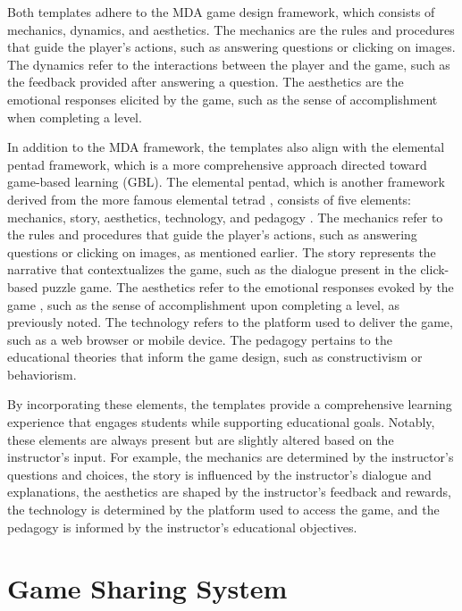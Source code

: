 Both templates adhere to the MDA \cite{MDA2004} game design framework, which consists of mechanics, dynamics, and aesthetics. The mechanics are the rules and procedures that guide the player's actions, such as answering questions or clicking on images. The dynamics refer to the interactions between the player and the game, such as the feedback provided after answering a question. The aesthetics are the emotional responses elicited by the game, such as the sense of accomplishment when completing a level.

In addition to the MDA framework, the templates also align with the elemental pentad framework, which is a more comprehensive approach directed toward game-based learning (GBL). The elemental pentad, which is another framework derived from the more famous elemental tetrad \cite{tetrad2011}, consists of five elements: mechanics, story, aesthetics, technology, and pedagogy \cite{ahmad2019}. The mechanics refer to the rules and procedures that guide the player's actions, such as answering questions or clicking on images, as mentioned earlier. The story represents the narrative that contextualizes the game, such as the dialogue present in the click-based puzzle game. The aesthetics refer to the emotional responses evoked by the game \cite{MDA2004}, such as the sense of accomplishment upon completing a level, as previously noted. The technology refers to the platform used to deliver the game, such as a web browser or mobile device. The pedagogy pertains to the educational theories that inform the game design, such as constructivism or behaviorism.

By incorporating these elements, the templates provide a comprehensive learning experience that engages students while supporting educational goals. Notably, these elements are always present but are slightly altered based on the instructor's input. For example, the mechanics are determined by the instructor's questions and choices, the story is influenced by the instructor's dialogue and explanations, the aesthetics are shaped by the instructor's feedback and rewards, the technology is determined by the platform used to access the game, and the pedagogy is informed by the instructor's educational objectives.


\section{Game Sharing System}

